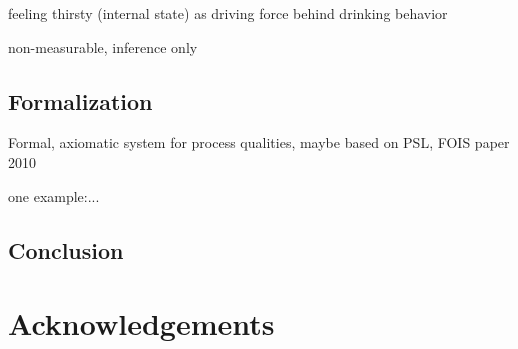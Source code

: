 \documentclass{bioinfo}
\begin{document}
feeling thirsty (internal state) as driving force behind drinking
behavior

non-measurable, inference only

\subsection{Formalization}
Formal, axiomatic system for process qualities, maybe based on PSL,
FOIS paper 2010

one example:...

\subsection{Conclusion}

\section{Acknowledgements}



    




 



\end{document}
